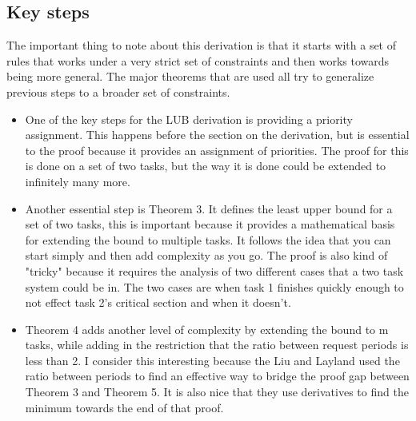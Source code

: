 \documentclass{article}
\begin{document}
\subsection*{Key steps}
The important thing to note about this derivation is that it starts with a set of rules that works under a very strict set of constraints and then works towards being more general. The major theorems that are used all try to generalize previous steps to a broader set of constraints.
\begin{itemize}
    \item One of the key steps for the LUB derivation is providing a priority assignment. This happens before the section on the derivation, but is essential to the proof because it provides an assignment of priorities. The proof for this is done on a set of two tasks, but the way it is done could be extended to infinitely many more.
    \item Another essential step is Theorem 3. It defines the least upper bound for a set of two tasks, this is important because it provides a mathematical basis for extending the bound to multiple tasks. It follows the idea that you can start simply and then add complexity as you go. The proof is also kind of "tricky" because it requires the analysis of two different cases that a two task system could be in. The two cases are when task 1 finishes quickly enough to not effect task 2's critical section and when it doesn't.
    \item Theorem 4 adds another level of complexity by extending the bound to m tasks, while adding in the restriction that the ratio between request periods is less than 2. I consider this interesting because the Liu and Layland used the ratio between periods to find an effective way to bridge the proof gap between Theorem 3 and Theorem 5. It is also nice that they use derivatives to find the minimum towards the end of that proof.
\end{itemize}
\end{document}
